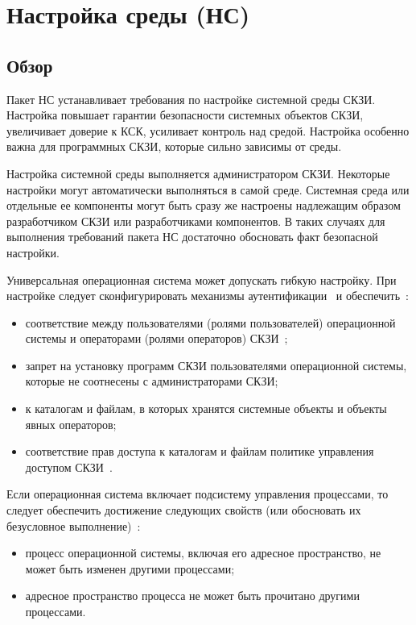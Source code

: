 \section{Настройка среды (НС)}\label{ES}

\subsection{Обзор}\label{ES.Defs}

Пакет НС устанавливает требования по настройке системной среды СКЗИ.
%
Настройка повышает гарантии безопасности системных объектов СКЗИ,
увеличивает доверие к КСК, усиливает контроль над средой.
%
Настройка особенно важна для программных СКЗИ, которые сильно зависимы от 
среды.

Настройка системной среды выполняется администратором СКЗИ.
Некоторые настройки могут автоматически выполняться в самой среде. 
%
Системная среда или отдельные ее компоненты могут быть сразу же 
настроены надлежащим образом разработчиком СКЗИ или разработчиками компонентов.  
%
В таких случаях для выполнения требований пакета НС достаточно обосновать факт 
безопасной настройки.

Универсальная операционная система может допускать гибкую настройку.
При настройке следует сконфигурировать механизмы 
аутентификации~ и
обеспечить~:
\begin{itemize}
\item
соответствие между пользователями (ролями пользователей) 
операционной системы и операторами (ролями операторов) 
СКЗИ~;
\item
запрет на установку программ СКЗИ пользователями операционной системы,
которые не соотнесены с администраторами СКЗИ;
\item
{} к каталогам и файлам, в которых хранятся 
системные объекты и объекты явных операторов;
\item
соответствие прав доступа к каталогам и файлам 
политике управления доступом СКЗИ~.
\end{itemize}

Если операционная система включает подсистему управления процессами,
то следует обеспечить достижение следующих свойств 
(или обосновать их безусловное выполнение)~:
\begin{itemize}
\item
процесс операционной системы, включая его адресное пространство, не может быть 
изменен другими процессами;
\item
адресное пространство процесса не может быть прочитано другими процессами.
\end{itemize}

